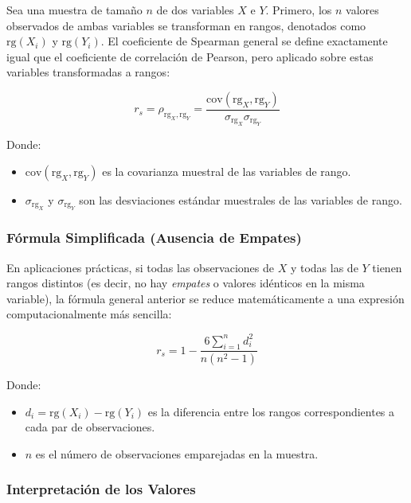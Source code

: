 \documentclass[12pt]{article}
\begin{document}
Sea una muestra de tamaño $n$ de dos variables $X$ e $Y$. Primero, los $n$ valores observados de ambas variables se transforman en rangos, denotados como $\text{rg}(X_i)$ y $\text{rg}(Y_i)$. El coeficiente de Spearman general se define exactamente igual que el coeficiente de correlación de Pearson, pero aplicado sobre estas variables transformadas a rangos\cite{ref1}:

\begin{equation}
r_s = \rho_{\text{rg}_X, \text{rg}_Y} = \frac{\text{cov}(\text{rg}_X, \text{rg}_Y)}{\sigma_{\text{rg}_X} \sigma_{\text{rg}_Y}}
\end{equation}

Donde:
\begin{itemize}
    \item $\text{cov}(\text{rg}_X, \text{rg}_Y)$ es la covarianza muestral de las variables de rango.
    \item $\sigma_{\text{rg}_X}$ y $\sigma_{\text{rg}_Y}$ son las desviaciones estándar muestrales de las variables de rango.
\end{itemize}

\subsubsection*{Fórmula Simplificada (Ausencia de Empates)}

En aplicaciones prácticas, si todas las observaciones de $X$ y todas las de $Y$ tienen rangos distintos (es decir, no hay \textit{empates} o valores idénticos en la misma variable), la fórmula general anterior se reduce matemáticamente a una expresión computacionalmente más sencilla\cite{ref1}:

\begin{equation}
r_s = 1 - \frac{6 \sum_{i=1}^{n} d_i^2}{n(n^2 - 1)}
\end{equation}

Donde:
\begin{itemize}
    \item $d_i = \text{rg}(X_i) - \text{rg}(Y_i)$ es la diferencia entre los rangos correspondientes a cada par de observaciones.
    \item $n$ es el número de observaciones emparejadas en la muestra.
\end{itemize}

\subsubsection*{Interpretación de los Valores}
\end{document}
